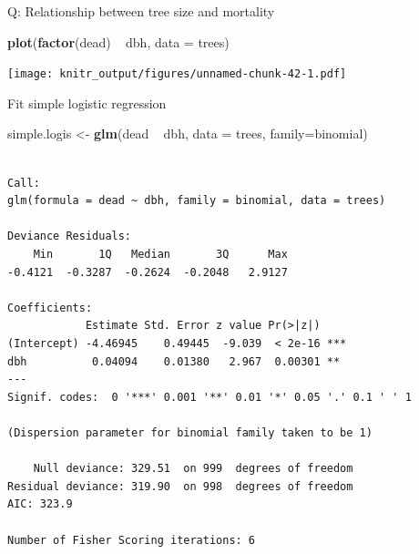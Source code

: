 \documentclass[10pt,ignorenonframetext,]{beamer}
\newenvironment{Shaded}{\begin{snugshade}}{\end{snugshade}}
\newcommand{\KeywordTok}[1]{\textcolor[rgb]{0.13,0.29,0.53}{\textbf{{#1}}}}
\newcommand{\DataTypeTok}[1]{\textcolor[rgb]{0.13,0.29,0.53}{{#1}}}
\newcommand{\StringTok}[1]{\textcolor[rgb]{0.31,0.60,0.02}{{#1}}}
\newcommand{\NormalTok}[1]{{#1}}
\begin{document}
\begin{frame}[fragile]{Q: Relationship between tree size and mortality}

\begin{Shaded}
\begin{Highlighting}[]
\KeywordTok{plot}\NormalTok{(}\KeywordTok{factor}\NormalTok{(dead) ~}\StringTok{ }\NormalTok{dbh, }\DataTypeTok{data =} \NormalTok{trees)}
\end{Highlighting}
\end{Shaded}

\texttt{[image: knitr\_output/figures/unnamed-chunk-42-1.pdf]}

\end{frame}

\begin{frame}[fragile]{Fit simple logistic regression}

\begin{Shaded}
\begin{Highlighting}[]
\NormalTok{simple.logis <-}\StringTok{ }\KeywordTok{glm}\NormalTok{(dead ~}\StringTok{ }\NormalTok{dbh, }\DataTypeTok{data =} \NormalTok{trees, }\DataTypeTok{family=}\NormalTok{binomial)}
\end{Highlighting}
\end{Shaded}

\begin{verbatim}

Call:
glm(formula = dead ~ dbh, family = binomial, data = trees)

Deviance Residuals: 
    Min       1Q   Median       3Q      Max  
-0.4121  -0.3287  -0.2624  -0.2048   2.9127  

Coefficients:
            Estimate Std. Error z value Pr(>|z|)    
(Intercept) -4.46945    0.49445  -9.039  < 2e-16 ***
dbh          0.04094    0.01380   2.967  0.00301 ** 
---
Signif. codes:  0 '***' 0.001 '**' 0.01 '*' 0.05 '.' 0.1 ' ' 1

(Dispersion parameter for binomial family taken to be 1)

    Null deviance: 329.51  on 999  degrees of freedom
Residual deviance: 319.90  on 998  degrees of freedom
AIC: 323.9

Number of Fisher Scoring iterations: 6
\end{verbatim}

\end{frame}
\end{document}
